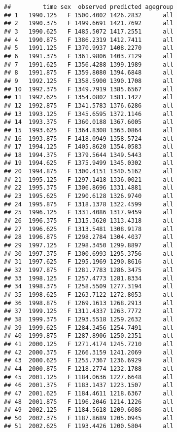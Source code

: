 \documentclass[]{article}
\begin{document}
\begin{verbatim}
##         time sex  observed predicted agegroup
## 1   1990.125   F 1500.4002 1426.2832      all
## 2   1990.375   F 1499.6691 1421.7692      all
## 3   1990.625   F 1485.5072 1417.2551      all
## 4   1990.875   F 1386.2319 1412.7411      all
## 5   1991.125   F 1370.9937 1408.2270      all
## 6   1991.375   F 1361.9806 1403.7129      all
## 7   1991.625   F 1356.4288 1399.1989      all
## 8   1991.875   F 1359.8080 1394.6848      all
## 9   1992.125   F 1358.5900 1390.1708      all
## 10  1992.375   F 1349.7919 1385.6567      all
## 11  1992.625   F 1354.0802 1381.1427      all
## 12  1992.875   F 1341.5783 1376.6286      all
## 13  1993.125   F 1345.6595 1372.1146      all
## 14  1993.375   F 1360.0188 1367.6005      all
## 15  1993.625   F 1364.8308 1363.0864      all
## 16  1993.875   F 1418.0949 1358.5724      all
## 17  1994.125   F 1405.8620 1354.0583      all
## 18  1994.375   F 1379.5644 1349.5443      all
## 19  1994.625   F 1375.9499 1345.0302      all
## 20  1994.875   F 1300.4151 1340.5162      all
## 21  1995.125   F 1297.1418 1336.0021      all
## 22  1995.375   F 1306.8696 1331.4881      all
## 23  1995.625   F 1290.6128 1326.9740      all
## 24  1995.875   F 1318.1378 1322.4599      all
## 25  1996.125   F 1331.4086 1317.9459      all
## 26  1996.375   F 1315.3620 1313.4318      all
## 27  1996.625   F 1313.5481 1308.9178      all
## 28  1996.875   F 1298.2784 1304.4037      all
## 29  1997.125   F 1298.3450 1299.8897      all
## 30  1997.375   F 1300.6993 1295.3756      all
## 31  1997.625   F 1295.1969 1290.8616      all
## 32  1997.875   F 1281.7783 1286.3475      all
## 33  1998.125   F 1257.4773 1281.8334      all
## 34  1998.375   F 1258.5509 1277.3194      all
## 35  1998.625   F 1263.7122 1272.8053      all
## 36  1998.875   F 1269.1613 1268.2913      all
## 37  1999.125   F 1311.4337 1263.7772      all
## 38  1999.375   F 1293.5518 1259.2632      all
## 39  1999.625   F 1284.3456 1254.7491      all
## 40  1999.875   F 1287.8906 1250.2351      all
## 41  2000.125   F 1271.4174 1245.7210      all
## 42  2000.375   F 1266.3159 1241.2069      all
## 43  2000.625   F 1255.7367 1236.6929      all
## 44  2000.875   F 1218.2774 1232.1788      all
## 45  2001.125   F 1184.0636 1227.6648      all
## 46  2001.375   F 1183.1437 1223.1507      all
## 47  2001.625   F 1184.4611 1218.6367      all
## 48  2001.875   F 1196.2046 1214.1226      all
## 49  2002.125   F 1184.5618 1209.6086      all
## 50  2002.375   F 1187.8689 1205.0945      all
## 51  2002.625   F 1193.4426 1200.5804      all

\end{verbatim}
\end{document}
